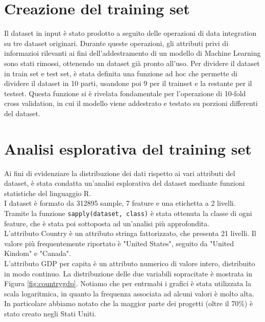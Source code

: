 \section{Creazione del training set}
Il dataset in input è stato prodotto a seguito delle operazioni di data integration su tre dataset originari. Durante queste operazioni, gli attributi privi di informazioi rilevanti ai fini dell'addestramento di un modello di Machine Learning sono stati rimossi, ottenendo un dataset già pronto all'uso. Per dividere il dataset in train set e test set, è stata definita una funzione ad hoc che permette di dividere il dataset in 10 parti, usandone poi 9 per il trainset e la restante per il testset. Questa funzione si è rivelata fondamentale per l'operazione di 10-fold cross validation, in cui il modello viene addestrato e testato su porzioni differenti del dataset.

\section{Analisi esplorativa del training set}
Ai fini di evidenziare la distribuzione dei dati rispetto ai vari attributi del dataset, è stata condatta un'analisi esplorativa del dataset mediante funzioni statistiche del linguaggio R.\\
I dataset è formato da 312895 sample, 7 feature e una etichetta a 2 livelli.
Tramite la funzione \texttt{sapply(dataset, class)} è stata ottenuta la classe di ogni feature, che è stata poi sottoposta ad un'analisi più approfondita.\\
L'attributo Country è un attributo stringa fattorizzato, che presenta 21 livelli. Il valore più frequentemente riportato è "United States", seguito da "United Kindom" e "Canada".\\
L'attributo GDP per capita è un attributo numerico di valore intero, distribuito in modo continuo. La distribuzione delle due variabili sopracitate è mostrata in Figura \ref{fig:countrygdp}. Notiamo che per entrmabi i grafici è stata utilizzata la scala logaritmica, in quanto la frequenza associata ad alcuni valori è molto alta. In particolare abbiamo notato che la maggior parte dei progetti (oltre il 70\%) è stato creato negli Stati Uniti.

